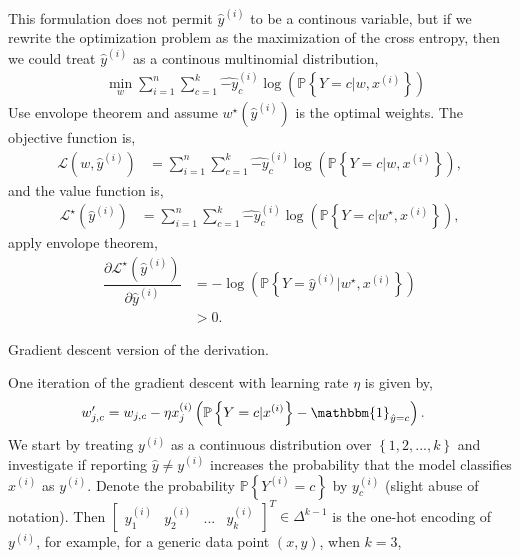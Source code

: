 \documentclass{article}
\begin{document}
\newline \newline
This formulation does not permit $\hat{y} ^{\left(i\right)}$ to be a continous variable, but if we rewrite the optimization problem as the maximization of the cross entropy, then we could treat $\hat{y} ^{\left(i\right)}$ as a continous multinomial distribution,
\begin{align*}
&\displaystyle\min_{w} \displaystyle\sum_{i=1}^{n} \displaystyle\sum_{c=1}^{k} \hat{-y}_{c}^{\left(i\right)} \log\left(\mathbb{P}\left\{Y = c | w, x^{\left(i\right)}\right\}\right)
\end{align*}
Use envolope theorem and assume $w^\star \left(\hat{y} ^{\left(i\right)}\right)$ is the optimal weights. The objective function is,
\begin{align*}
\mathcal{L}\left(w, \hat{y} ^{\left(i\right)}\right) &= \displaystyle\sum_{i=1}^{n} \displaystyle\sum_{c=1}^{k} \hat{-y}_{c}^{\left(i\right)} \log\left(\mathbb{P}\left\{Y = c | w, x^{\left(i\right)}\right\}\right),
\end{align*}
and the value function is,
\begin{align*}
\mathcal{L}^\star \left(\hat{y} ^{\left(i\right)}\right) &= \displaystyle\sum_{i=1}^{n} \displaystyle\sum_{c=1}^{k} \hat{-y}_{c}^{\left(i\right)} \log\left(\mathbb{P}\left\{Y = c | w^\star , x^{\left(i\right)}\right\}\right),
\end{align*}
apply envolope theorem,
\begin{align*}
\dfrac{\partial \mathcal{L}^\star \left(\hat{y} ^{\left(i\right)}\right)}{\partial \hat{y} ^{\left(i\right)}} &= -\log\left(\mathbb{P}\left\{Y = \hat{y} ^{\left(i\right)} | w^\star , x^{\left(i\right)}\right\}\right)
\\ &> 0.
\end{align*}
\begin{tcolorbox}[colback = white]
Gradient descent version of the derivation.
\end{tcolorbox}
One iteration of the gradient descent with learning rate $\eta$ is given by,
\begin{align*}
w'_{j,c} &= w_{j,c} - \eta x_{j}^{\left(i\right)} \left(\mathbb{P}\left\{Y = c | x^{\left(i\right)}\right\} - \mathbbm{1}_{\hat{y} = c}\right).
\end{align*}
We start by treating $y^{\left(i\right)}$ as a continuous distribution over $\left\{1, 2, ..., k \right\}$ and investigate if reporting $\hat{y} \neq  y^{\left(i\right)}$ increases the probability that the model classifies $x^{\left(i\right)}$ as $y^{\left(i\right)}$. Denote the probability $\mathbb{P}\left\{Y^{\left(i\right)} = c\right\}$ by $y_{c}^{\left(i\right)}$ (slight abuse of notation). Then $\begin{bmatrix} y_{1}^{\left(i\right)} & y_{2}^{\left(i\right)} & ... & y_{k}^{\left(i\right)} \end{bmatrix} ^{T} \in \Delta^{k-1}$ is the one-hot encoding of $y^{\left(i\right)}$, for example, for a generic data point $\left(x , y \right)$, when $k  = 3$,
\end{document}
